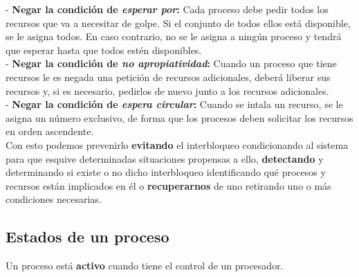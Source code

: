 \documentclass[spanish, 12pt]{article}
\begin{document}
				- \textbf{Negar la condición de \textit{esperar por}:} Cada proceso debe pedir todos los recursos que va a necesitar de golpe. Si el conjunto de todos ellos está disponible, se le asigna todos. En caso contrario, no se le asigna a ningún proceso y tendrá que esperar hasta que todos estén disponibles.\\
				
				- \textbf{Negar la condición de \textit{no apropiatividad}:} Cuando un proceso que tiene recursos le es negada una petición de recursos adicionales, deberá liberar sus recursos y, si es necesario, pedirlos de nuevo junto a los recursos adicionales.\\
				
				- \textbf{Negar la condición de \textit{espera circular}:} Cuando se intala un recurso, se le asigna un número exclusivo, de forma que los procesos deben solicitar los recursos en orden ascendente.\\
				
				Con esto podemos prevenirlo \textbf{evitando} el interbloqueo condicionando al sistema para que esquive determinadas situaciones propensas a ello, \textbf{detectando} y determinando si existe o no dicho interbloqueo identificando qué procesos y recursos están implicados en él o \textbf{recuperarnos} de uno retirando uno o más condiciones necesarias.\\
				
		\newpage
				
		\subsection{Estados de un proceso}
			
			\vfill
			
			\begin{figure}[H]
				\centerline{}
			\end{figure}	
											
			Un proceso está \textbf{activo} cuando tiene el control de un procesador.\\
			
\end{document}
